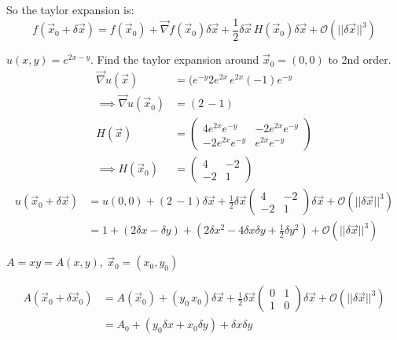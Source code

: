 \documentclass[10pt]{scrartcl}
\begin{document}
So the taylor expansion is:
\begin{equation}\boxed{f(\vec{x}_0 + \delta \vec{x}) = f(\vec{x}_0) + \vec{\nabla}f(\vec{x}_0)\delta \vec{x} + \frac{1}{2}\delta\vec{x}\,H(\vec{x}_0)\delta\vec{x} + \mathcal{O}(||\delta\vec{x}||^3)}\end{equation}
\pagebreak
\begin{example}
$u(x,y) = e^{2x-y}$. Find the taylor expansion around $\vec{x}_0 = (0,0)$ to 2nd order. 
\[
\begin{aligned}
  \vec{\nabla}u(\vec{x}) &= (e^{-y}2e^{2x}\, e^{2x}(-1)e^{-y}\\
  \implies \vec{\nabla}u(\vec{x}_0) &= (2\,-1)\\[0.1cm]
  H(\vec{x}) &= \begin{pmatrix}
 4e^{2x}e^{-y} & -2e^{2x}e^{-y}\\
 -2e^{2x}e^{-y} & e^{2x}e^{-y}	
 \end{pmatrix}\\
 \implies H(\vec{x}_0) &= \begin{pmatrix}
 	4 & -2 \\ -2 & 1
 \end{pmatrix}
\end{aligned}
\]
\[
\begin{aligned}
  u(\vec{x}_0 + \delta \vec{x}) &= u(0,0) + (2 \, -1)\delta \vec{x} + \frac{1}{2}\delta \vec{x} \begin{pmatrix}
  4 & -2\\ -2 & 1
  \end{pmatrix}\delta \vec{x} + \mathcal{O}(||\delta\vec{x}||^3)\\
  &= 1 + (2\delta x -\delta y) + (2\delta x^2 -4\delta x \delta y + \frac{1}{2}\delta y^2) + \mathcal{O}(||\delta\vec{x}||^3)
\end{aligned}
\]
\end{example}

\begin{example}
$A = xy = A(x,y),~ \vec{x}_0 = (x_0, y_0)$

\[
\begin{aligned}
  A(\vec{x}_0+ \delta \vec{x}_0) &= A(\vec{x}_0) + (y_0\, x_0)\delta \vec{x} + \frac{1}{2}\delta\vec{x}\begin{pmatrix}
0 & 1\\ 1 & 0	
\end{pmatrix}\delta\vec{x} + \mathcal{O}(||\delta\vec{x}||^3)\\
&= A_0 + (y_0\delta x + x_0\delta y) + \delta x \delta y
\end{aligned}
\]
\end{example}~
\end{document}
